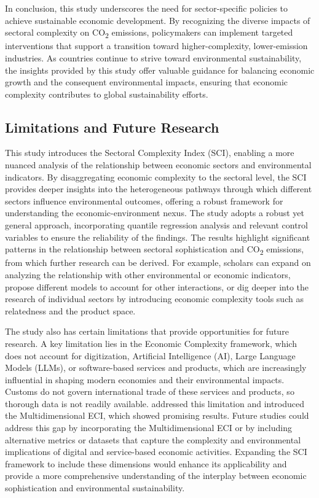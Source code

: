 \documentclass[10pt]{article}
\begin{document}
In conclusion, this study underscores the need for sector-specific policies to achieve sustainable economic development. By recognizing the diverse impacts of sectoral complexity on CO\textsubscript{2} emissions, policymakers can implement targeted interventions that support a transition toward higher-complexity, lower-emission industries. As countries continue to strive toward environmental sustainability, the insights provided by this study offer valuable guidance for balancing economic growth and the consequent environmental impacts, ensuring that economic complexity contributes to global sustainability efforts.

\subsection{Limitations and Future Research}
This study introduces the Sectoral Complexity Index (SCI), enabling a more nuanced analysis of the relationship between economic sectors and environmental indicators. By disaggregating economic complexity to the sectoral level, the SCI provides deeper insights into the heterogeneous pathways through which different sectors influence environmental outcomes, offering a robust framework for understanding the economic-environment nexus. The study adopts a robust yet general approach, incorporating quantile regression analysis and relevant control variables to ensure the reliability of the findings. The results highlight significant patterns in the relationship between sectoral sophistication and CO\textsubscript{2} emissions, from which further research can be derived. For example, scholars can expand on analyzing the relationship with other environmental or economic indicators, propose different models to account for other interactions, or dig deeper into the research of individual sectors by introducing economic complexity tools such as relatedness and the product space.

The study also has certain limitations that provide opportunities for future research. A key limitation lies in the Economic Complexity framework, which does not account for digitization, Artificial Intelligence (AI), Large Language Models (LLMs), or software-based services and products, which are increasingly influential in shaping modern economies and their environmental impacts. Customs do not govern international trade of these services and products, so thorough data is not readily available. \cite{stojkoskiMultidimensionalEconomicComplexity2023} addressed this limitation and introduced the Multidimensional ECI, which showed promising results. Future studies could address this gap by incorporating the Multidimensional ECI or by including alternative metrics or datasets that capture the complexity and environmental implications of digital and service-based economic activities. Expanding the SCI framework to include these dimensions would enhance its applicability and provide a more comprehensive understanding of the interplay between economic sophistication and environmental sustainability.
\end{document}
